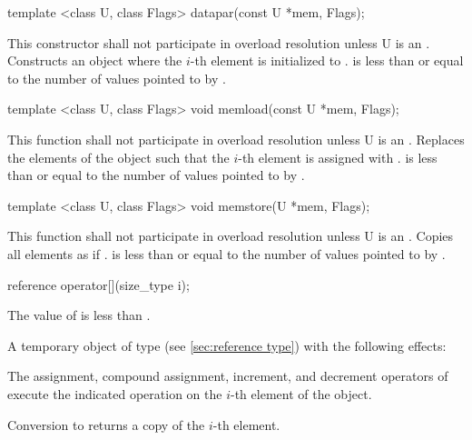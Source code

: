 \begin{itemdecl}
template <class U, class Flags> datapar(const U *mem, Flags);
\end{itemdecl}
\begin{itemdescr}
  \pnum\remarks This constructor shall not participate in overload resolution unless \type U is an \realArithmeticType.
  \pnum\effects Constructs an object where the $i$-th element is initialized to  \foralli.
  \pnum\requires {} is less than or equal to the number of values pointed to by .
\end{itemdescr}

\begin{itemdecl}
template <class U, class Flags> void memload(const U *mem, Flags);
\end{itemdecl}
\begin{itemdescr}
  \pnum\remarks This function shall not participate in overload resolution unless \type U is an \realArithmeticType.
  \pnum\effects Replaces the elements of the \datapar object such that the $i$-th element is assigned with  \foralli.
  \pnum\requires {} is less than or equal to the number of values pointed to by .
\end{itemdescr}

\begin{itemdecl}
template <class U, class Flags> void memstore(U *mem, Flags);
\end{itemdecl}
\begin{itemdescr}
  \pnum\remarks This function shall not participate in overload resolution unless \type U is an \realArithmeticType.
  \pnum\effects Copies all \datapar elements as if  \foralli.
  \pnum\requires {} is less than or equal to the number of values pointed to by .
\end{itemdescr}

\newcommand\dataparElementReference[1]{
  \pnum\requires The value of \code{i} is less than \code{size()}.

  \pnum\returns A temporary object of type \referencetype (see \ref{sec:reference type}) with the following effects:

  \pnum\effects The assignment, compound assignment, increment, and decrement operators of \referencetype execute the indicated operation on the $i$-th element of the #1 object.

  \pnum\effects Conversion to \valuetype returns a copy of the $i$-th element.
}
\begin{itemdecl}
reference operator[](size_type i);
\end{itemdecl}
\begin{itemdescr}
  \dataparElementReference{\datapar{}}
\end{itemdescr}

